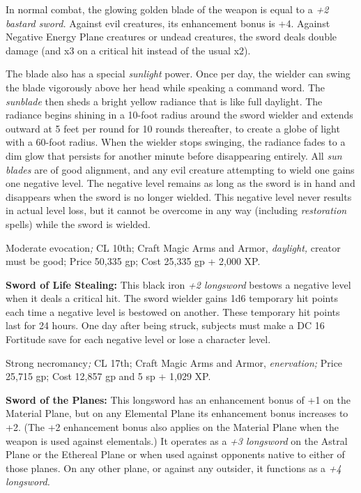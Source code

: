\documentclass{article}
\begin{document}
In normal combat, the glowing golden blade of the weapon is equal to a \textit{+2 
bastard sword. }Against evil creatures, its enhancement bonus is +4. Against Negative 
Energy Plane creatures or undead creatures, the sword deals double damage (and 
x3 on a critical hit instead of the usual x2).

The blade also has a special \textit{sunlight }power. Once per day, the wielder 
can swing the blade vigorously above her head while speaking a command word. The 
\textit{sunblade }then sheds a bright yellow radiance that is like full daylight. 
The radiance begins shining in a 10-foot radius around the sword wielder and extends 
outward at 5 feet per round for 10 rounds thereafter, to create a globe of light 
with a 60-foot radius. When the wielder stops swinging, the radiance fades to a 
dim glow that persists for another minute before disappearing entirely. All \textit{sun 
blades }are of good alignment, and any evil creature attempting to wield one gains 
one negative level. The negative level remains as long as the sword is in hand 
and disappears when the sword is no longer wielded. This negative level never results 
in actual level loss, but it cannot be overcome in any way (including \textit{restoration 
}spells) while the sword is wielded.

Moderate evocation\textit{; }CL 10th; Craft Magic Arms and Armor, \textit{daylight, 
}creator must be good; Price 50,335 gp; Cost 25,335 gp + 2,000 XP.

\textbf{Sword of Life Stealing: }This black iron \textit{+2 longsword }bestows 
a negative level when it deals a critical hit. The sword wielder gains 1d6 temporary 
hit points each time a negative level is bestowed on another. These temporary hit 
points last for 24 hours. One day after being struck, subjects must make a DC 16 
Fortitude save for each negative level or lose a character level.

Strong necromancy\textit{; }CL 17th; Craft Magic Arms and Armor, \textit{enervation; 
}Price 25,715 gp; Cost 12,857 gp and 5 sp + 1,029 XP.

\textbf{Sword of the Planes: }This longsword has an enhancement bonus of +1 on 
the Material Plane, but on any Elemental Plane its enhancement bonus increases 
to +2. (The +2 enhancement bonus also applies on the Material Plane when the weapon 
is used against elementals.) It operates as a \textit{+3 longsword }on the Astral 
Plane or the Ethereal Plane or when used against opponents native to either of 
those planes. On any other plane, or against any outsider, it functions as a \textit{+4 
longsword.}
\end{document}
